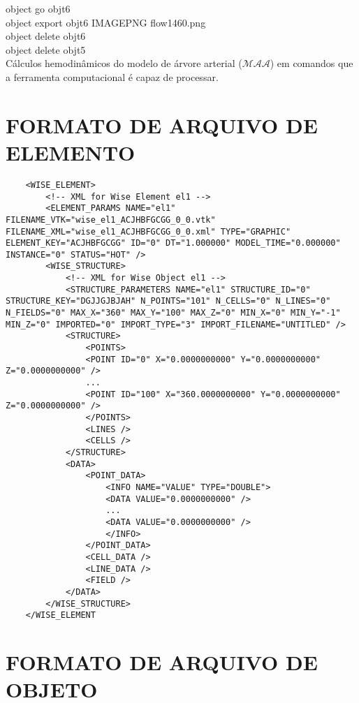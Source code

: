 \begin{appendices}
\begin{algorithm}[H]
		object go obj\underline{\space\space}t6 \\
		object export obj\underline{\space\space}t6 IMAGE\underline{\space\space}PNG flow\underline{\space\space}14\underline{\space\space}60.png \\
		object delete obj\underline{\space\space}t6 \\
		object delete obj\underline{\space\space}t5 \\
		\caption{Cálculos hemodinâmicos do modelo de árvore arterial ($\mathcal{MAA}$) em comandos que a ferramenta computacional é capaz de processar.}
	\end{algorithm}
	
	\chapter{FORMATO DE ARQUIVO DE ELEMENTO}\label{annex3}
	
	\lstset{language=XML}
	\begin{lstlisting}
	<WISE_ELEMENT>
		<!-- XML for Wise Element el1 -->
		<ELEMENT_PARAMS NAME="el1" FILENAME_VTK="wise_el1_ACJHBFGCGG_0_0.vtk" FILENAME_XML="wise_el1_ACJHBFGCGG_0_0.xml" TYPE="GRAPHIC" ELEMENT_KEY="ACJHBFGCGG" ID="0" DT="1.000000" MODEL_TIME="0.000000" INSTANCE="0" STATUS="HOT" />
		<WISE_STRUCTURE>
			<!-- XML for Wise Object el1 -->
			<STRUCTURE_PARAMETERS NAME="el1" STRUCTURE_ID="0" STRUCTURE_KEY="DGJJGJBJAH" N_POINTS="101" N_CELLS="0" N_LINES="0" N_FIELDS="0" MAX_X="360" MAX_Y="100" MAX_Z="0" MIN_X="0" MIN_Y="-1" MIN_Z="0" IMPORTED="0" IMPORT_TYPE="3" IMPORT_FILENAME="UNTITLED" />
			<STRUCTURE>
				<POINTS>
				<POINT ID="0" X="0.0000000000" Y="0.0000000000" Z="0.0000000000" />
				...
				<POINT ID="100" X="360.0000000000" Y="0.0000000000" Z="0.0000000000" />
				</POINTS>
				<LINES />
				<CELLS />
			</STRUCTURE>
			<DATA>
				<POINT_DATA>
					<INFO NAME="VALUE" TYPE="DOUBLE">
					<DATA VALUE="0.0000000000" />
					...
					<DATA VALUE="0.0000000000" />
					</INFO>
				</POINT_DATA>
				<CELL_DATA />
				<LINE_DATA />
				<FIELD />
			</DATA>
		</WISE_STRUCTURE>
	</WISE_ELEMENT
	\end{lstlisting}
	
	\chapter{FORMATO DE ARQUIVO DE OBJETO}\label{annex4}
	

\end{appendices}
